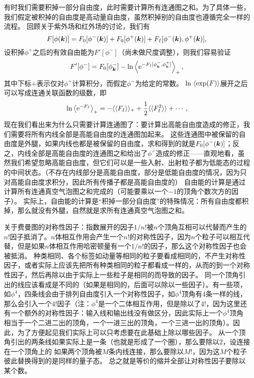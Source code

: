 \documentclass[hyperref, UTF8, a4paper]{ctexart}
\newcommand*{\ee}{\mathrm{e}}
\newcommand*{\cexpval}[1]{\langle \langle #1 \rangle \rangle}
\begin{document}
有时我们需要积掉一部分自由度，此时需要计算所有连通图之和。为了具体一些，我们假定被积掉的自由度是高动量自由度，虽然积掉别的自由度也遵循完全一样的流程。
回顾关于紫外场和红外场的讨论，我们有
\[
    F[\phi(\vb*{k})] = F_0 [\phi^-(\vb*{k})] + F_0 [\phi^+(\vb*{k})] + F_I [\phi^-(\vb*{k}) , \phi^+ (\vb*{k})],
\]
设积掉$\phi^+$之后的有效自由能为$F'[\phi^-]$（尚未做尺度调整），则我们容易验证
\[
    F'[\phi^-] = F_0[\phi^-_{\vb*{k}}] - \ln \expval{\ee^{-F_I[\phi_{\vb*{k}}^-, \phi_{\vb*{k}}^+]}}_+,
\]
其中下标$+$表示仅对$\phi^+$计算积分，而假定$\phi^-$为给定的常数。
$\ln \expval*{\exp(F)}$展开之后可以写成连通关联函数的级数，即
\begin{equation}
    \ln \expval{\ee^{-F_I}}_+ = - \cexpval{F_I}_+ + \frac{1}{2} \cexpval{F_I^2} + \cdots,
\end{equation}
现在我们看出来为什么只需要计算连通图了：要计算出高能自由度造成的修正，我们需要将所有内线全部是高能自由度的连通图加起来。
这些连通图中被保留的自由度是外腿，如果内线也都是被保留的自由度，求和得到的就是$F_0[\phi^-(\vb*{k})]$；反之，内线全部是高能自由度的连通图之和给出了$\phi^+$造成的修正——直观地看，虽然我们希望忽略高能自由度，但它们可以是一些入射、出射粒子都为低能态的过程的中间状态。（不存在内线部分是高能自由度，部分是低能自由度的情况，因为只对高能自由度求积分，因此所有传播子都是高能自由度的）
自由能的计算是通过计算所有连通真空气泡图之和完成的（可能要乘以一个$-1$的顶角个数次方的因子）。
实际上，自由能的计算是“积掉一部分自由度”的特殊情况：所有自由度都积掉，那么就没有外腿，自然就是求所有连通真空气泡图之和。

关于费曼图的对称性因子：指数展开的因子$1/n!$被$n$个顶角互相可以代替而产生的$n!$因子抵消了。$n$体相互作用会产生一个$n!$的对称性因子，因为$n$个粒子可以相互代替，但是如果$n$体相互作用哈密顿量有一个$1/n!$的因子，那么这个对称性因子也会被抵消。
种类相同、各个标签如动量等相同的粒子要看成相同的，不产生对称性因子，或者实际上应该先把所有种类相同的粒子都看成一样的，从而的到一个对称性因子，然后再除以由于实际上一些粒子是相同的而导致的因子。
同一个顶角引出的线应该看成是不同的（如果是相同的，后面可以除以一些因子）。有一些项，如$\phi^4$，四条线会由于排列自由度引入一个对称性因子，如$\phi^4$顶角有4条一样的线，那么会引入一个$4!$因子（注：$\phi^4$是一个二体相互作用，但是除以了$4!$，因为这里还有一个额外的对称性因子：输入线和输出线没有做区分，因此实际上一个$\phi^4$顶角相当于一个二进二出的顶角，一个一进三出的顶角，一个三进一出的顶角）。因此，为了方便起见我们实际上可以只考虑要在此基础上除以哪些因子。
从一个顶角引出的两条线如果实际上是一条（也就是形成了一个圈），那么要除以$2$，设连接在一个顶角上的
如果两个顶角被$M$条内线连接，那么要除以$M!$，因为这$M$个粒子彼此替换得到的是同样的量子态。
总之就是等价的缩并全部让对称性因子要除以某个数。
\end{document}

